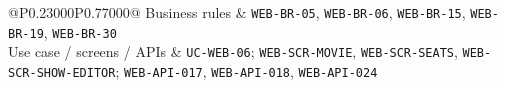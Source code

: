 \begin{longtable}{@{}P{0.23000\SRSWidth}P{0.77000\SRSWidth}@{}}
Business rules & \texttt{WEB-\allowbreak{}BR-\allowbreak{}05}, \texttt{WEB-\allowbreak{}BR-\allowbreak{}06}, \texttt{WEB-\allowbreak{}BR-\allowbreak{}15}, \texttt{WEB-\allowbreak{}BR-\allowbreak{}19}, \texttt{WEB-\allowbreak{}BR-\allowbreak{}30} \\[3pt]
Use case /\allowbreak{} screens /\allowbreak{} APIs & \texttt{UC-\allowbreak{}WEB-\allowbreak{}06}; \texttt{WEB-\allowbreak{}SCR-\allowbreak{}MOVIE}, \texttt{WEB-\allowbreak{}SCR-\allowbreak{}SEATS}, \texttt{WEB-\allowbreak{}SCR-\allowbreak{}SHOW-\allowbreak{}EDITOR}; \texttt{WEB-\allowbreak{}API-\allowbreak{}017}, \texttt{WEB-\allowbreak{}API-\allowbreak{}018}, \texttt{WEB-\allowbreak{}API-\allowbreak{}024} \\[3pt]
\end{longtable}
\endgroup

